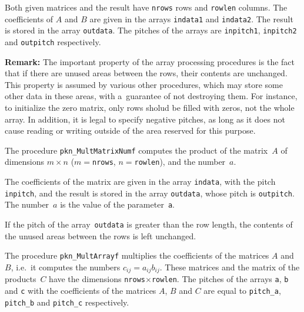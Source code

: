 \vspace{\medskipamount}
Both given matrices and the result have \texttt{nrows} rows and \texttt{rowlen}
columns. The coefficients of $A$ and $B$ are given in the arrays
\texttt{indata1} and \texttt{indata2}. The result is stored in the array
\texttt{outdata}. The pitches of the arrays are
\texttt{inpitch1}, \texttt{inpitch2} and \texttt{outpitch} respectively.

\vspace{\medskipamount}
\noindent
\textbf{Remark:} The important property of the array processing procedures
is the fact that if there are unused areas between the rows, their
contents are unchanged. This property is assumed by various other procedures,
which may store some other data in these areas, with a~guarantee of not
destroying them. For instance, to initialize the zero matrix, only rows
sholud be filled with zeros, not the whole array. In addition, it is legal
to specify negative pitches, as long as it does not cause reading or writing
outside of the area reserved for this purpose.

\vspace{\bigskipamount}
The procedure \texttt{pkn\_MultMatrixNumf} computes the product of the matrix~$A$
of dimensions $m\times n$ ($m={}$\texttt{nrows}, $n={}$\texttt{rowlen}),
and the number~$a$.

The coefficients of the matrix are given in the array \texttt{indata},
with the pitch \texttt{inpitch}, and the result is stored in the array
\texttt{outdata}, whose pitch is \texttt{outpitch}. The number~$a$ is the value
of the parameter~\texttt{a}.

If the pitch of the array~\texttt{outdata} is greater than the row length,
the contents of the unused areas between the rows is left unchanged.


\newpage
The procedure \texttt{pkn\_MultArrayf} multiplies the coefficients of the matrices
$A$ and $B$, i.e.\ it computes the numbers $c_{ij}=a_{ij}b_{ij}$. These matrices
and the matrix of the products~$C$ have the dimensions
 \texttt{nrows}$\times$\texttt{rowlen}.
The pitches of the arrays \texttt{a}, \texttt{b} and \texttt{c} with the
coefficients of the matrices $A$, $B$ and $C$ are equal to \texttt{pitch\_a},
\texttt{pitch\_b} and \texttt{pitch\_c} respectively.

